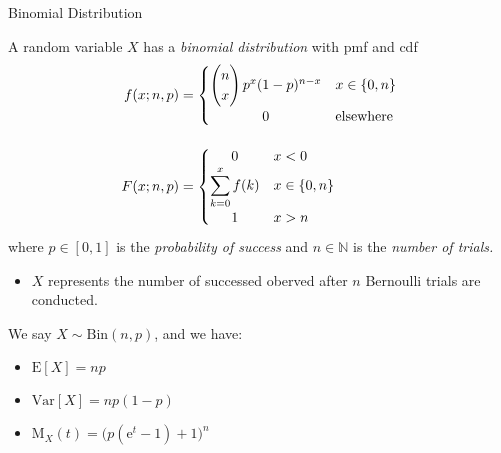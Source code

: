 \documentclass[8pt, handout]{beamer}
\renewcommand{\emph}[1]{\textcolor{defcol}{\textsl{#1}}}
\begin{document}
\begin{frame}{Binomial Distribution}

    A random variable \(X\) has a \emph{binomial distribution} with pmf and cdf 
    \begin{align*}
        f(x;n,p) &= \begin{cases}
            \begin{pmatrix}
                n \\ x
            \end{pmatrix} p^x (1 - p)^{n - x} & x \in \{ 0, n \} \\
                \hfil 0 & \text{elsewhere}
        \end{cases} \\[1em]
        F(x;n,p) &=  \begin{cases}
            \hfil 0 & x < 0 \\
            \displaystyle \sum_{k=0}^x f(k) & x \in \{0, n\} \\
            \hfil 1 & x > n
        \end{cases}
    \end{align*}
    where \(p \in [0,1]\) is the \emph{probability of success} and \(n \in \mathbb{N}\) is the \emph{number of trials.}
    \begin{itemize}
        \item \(X\) represents the number of successed oberved after \(n\) Bernoulli trials are conducted. 
    \end{itemize}

    \vspace{2em}
    We say \(X \sim \mathrm{Bin}(n,p)\), and we have:
    \begin{itemize}
        \item \(\mathrm{E}[X] = np\)
        \item \(\mathrm{Var}[X] = np(1 - p)\)
        \item \(\mathrm{M}_X(t) = \big( p(\mathrm{e}^t - 1) + 1 \big)^n\)
    \end{itemize}

\end{frame}

\begin{frame}{}

    

\end{frame}
\end{document}
